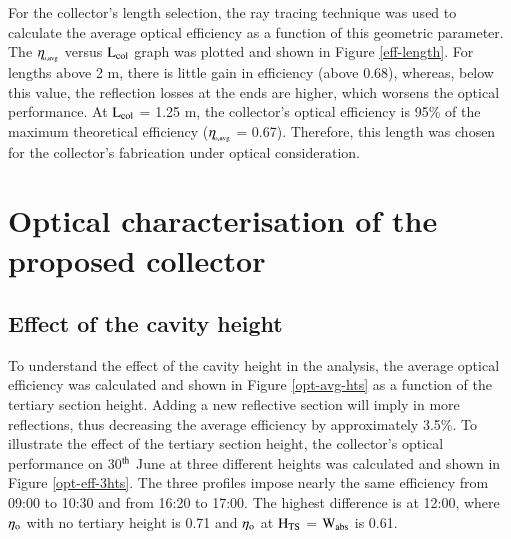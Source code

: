 
For the collector's length selection, the ray tracing technique was used to calculate the average optical efficiency as a function of this geometric parameter. The $\rm{\eta_{\!_{o,avg}}}$ versus $\rm{L_{col}}$ graph was plotted and shown in Figure \ref{eff-length}. For lengths above 2 m, there is little gain in efficiency (above 0.68), whereas, below this value, the reflection losses at the ends are higher, which worsens the optical performance. At $\rm{L_{col}}$ = 1.25 m, the collector's optical efficiency is 95\% of the maximum theoretical efficiency ($\rm{\eta_{\!_{o,avg}}}$ = 0.67). Therefore, this length was chosen for the collector's fabrication under optical consideration.




\section{Optical characterisation of the proposed collector}

\subsection{Effect of the cavity height}

To understand the effect of the cavity height in the analysis, the average optical efficiency was calculated and shown in Figure \ref{opt-avg-hts} as a function of the tertiary section height. Adding a new reflective section will imply in more reflections, thus decreasing the average efficiency by approximately 3.5\%. To illustrate the effect of the tertiary section height, the collector's optical performance on 30$^{\rm th}$ June at three different heights was calculated and shown in Figure \ref{opt-eff-3hts}. The three profiles impose nearly the same efficiency from 09:00 to 10:30 and from 16:20 to 17:00. The highest difference is at 12:00, where $\eta_{\rm{o}}$ with no tertiary height is 0.71 and $\eta_{\rm{o}}$ at $\rm{H_{TS}}$ = $\rm{W_{abs}}$ is 0.61.



